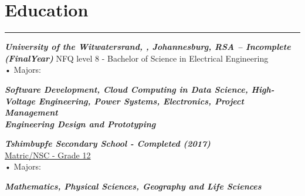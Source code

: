 \documentclass[12pt]{article}
\begin{document}
\vspace{-5mm} \section*{\fontsize{14}{1}\selectfont\color{color_29791}Education}\vspace{-10pt} 
\rule{\textwidth}{0.4pt}
\vspace{2pt}
\textbf{\textit{\fontsize{12}{1}\selectfont\color{color_29791}University of the Witwatersrand, , Johannesburg, RSA – Incomplete (FinalYear)}} %
\fontsize{10}{1}\selectfont\color{color_29791}NFQ level 8 - Bachelor of Science in Electrical Engineering\\
{{\fontsize{10}{1}\selectfont\color{color_29791}\hspace{10mm}• Majors:}}
\parbox{\textwidth}{\raggedright
    \textbf{\textit{\fontsize{8}{1}\selectfont\color{color_29791}Software Development, Cloud Computing in Data Science, High-Voltage Engineering, Power Systems, Electronics, Project Management \\ Engineering Design and Prototyping}}
} \vspace{4pt}
\textbf{\textit{\fontsize{12}{1}\selectfont\color{color_29791}Tshimbupfe Secondary School - Completed (2017)}}\\
\fontsize{10}{1}\selectfont\color{color_29791}\href{https://drive.google.com/file/d/1i5SDy8WoBzwGOmAEAcxJzVyCb1c7Gfqq/view?usp=sharing}{\underline{Matric/NSC - Grade 12}}\\
{{\fontsize{10}{1}\selectfont\color{color_29791}\hspace{10mm}• Majors:}}
\parbox{\textwidth}{\raggedright
    \textbf{\textit{\fontsize{9}{1}\selectfont\color{color_29791}Mathematics, Physical Sciences, Geography and Life Sciences}}
}
\end{document}
